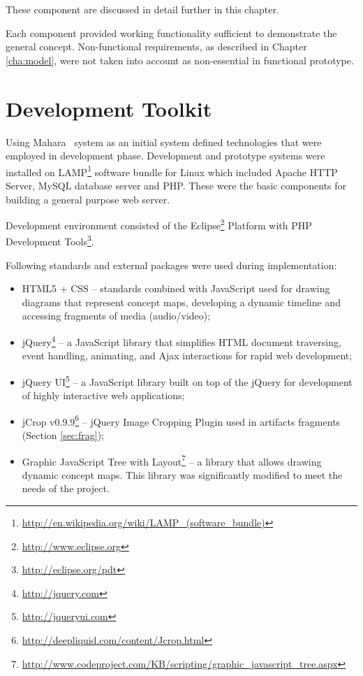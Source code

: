 These component are discussed in detail further in this chapter.

Each component provided working functionality sufficient to demonstrate the
general concept. Non-functional requirements, as described in Chapter
\ref{cha:model}, were not taken into account as non-essential in functional
prototype.

\section{Development Toolkit}

Using Mahara \ep~system as an initial system defined technologies that were
employed in development phase. Development and prototype systems were installed
on LAMP\footnote{\url{http://en.wikipedia.org/wiki/LAMP_(software_bundle)}}
software bundle for Linux which included Apache HTTP Server, MySQL database
server and PHP. These were the basic components for building a general purpose
web server.

Development environment consisted of the
Eclipse\footnote{\url{http://www.eclipse.org}} Platform with PHP Development
Tools\footnote{\url{http://eclipse.org/pdt}}.

Following standards and external packages were used during implementation:

\begin{itemize}

\item HTML5 + CSS -- standards combined with JavaScript used for drawing
diagrams that represent concept maps, developing a dynamic timeline and
accessing fragments of media (audio/video);

\item jQuery\footnote{\url{http://jquery.com}} -- a JavaScript library that
simplifies HTML document traversing, event handling, animating, and Ajax
interactions for rapid web development;

\item jQuery UI\footnote{\url{http://jqueryui.com}} -- a JavaScript library
built on top of the jQuery for development of highly interactive web applications;

\item jCrop v0.9.9\footnote{\url{http://deepliquid.com/content/Jcrop.html}}
-- jQuery Image Cropping Plugin used in artifacts fragments (Section
\ref{sec:frag});

\item Graphic JavaScript Tree with
Layout\footnote{\url{http://www.codeproject.com/KB/scripting/graphic_javascript_tree.aspx}}
-- a library that allows drawing dynamic concept maps. This library was
significantly modified to meet the needs of the project.
\end{itemize}

